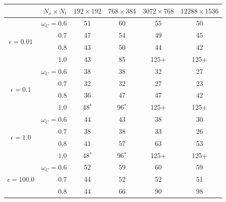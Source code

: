 \documentclass[VANCOUVER,STIX1COL]{WileyNJD-v2}
\begin{document}
\begin{table}[h!]
\centering
\begin{tabular}{c r|c|c|c|c}
    
     & $N_x \times N_t$ & $192 \times 192$ & $768 \times 384$ & $3072 \times 768$ & $12288 \times 1536$ \\  \toprule
     \multirow{4}{*}{$\epsilon=0.01$} & $\omega_C=0.6$  & 51 & 60 & 55 & 50 \\ 
                                                &$0.7$  & 47 & 54 & 49 & 45 \\ 
                                                &$0.8$  & 43 & 50 & 44 & 42 \\ 
                                                &$1.0$  & 43 & 85 &125+& 125+\\ \midrule
     \multirow{4}{*}{$\epsilon=0.1$} & $\omega_C=0.6$   & 38 & 38 & 32 & 27 \\ 
                                                &$0.7$  & 32 & 32 & 27 & 23 \\ 
                                                &$0.8$  & 36 & 47 & 47 & 42 \\ 
                                                &$1.0$  & 48$^{*}$ & 96$^{*}$&125+&125+ \\ \midrule
     \multirow{4}{*}{$\epsilon=1.0$}  & $\omega_C=0.6$  & 44 & 43 &38  & 30 \\ 
                                                &$0.7$  & 38 & 38 &33  & 26 \\ 
                                                &$0.8$  & 41 & 57 &63  & 53 \\ 
                                                &$1.0$  & 48$^{*}$ & 96$^{*}$ &125+&125+ \\ \midrule
     \multirow{4}{*}{$\epsilon=100.0$}& $\omega_C=0.6$  & 52 & 59 &60  & 59 \\ 
                                                &$0.7$  & 44 & 52 &52  & 51 \\ 
                                                &$0.8$  & 44 & 66 &90  & 98 \\ 

\end{tabular}
\end{table}
\end{document}
